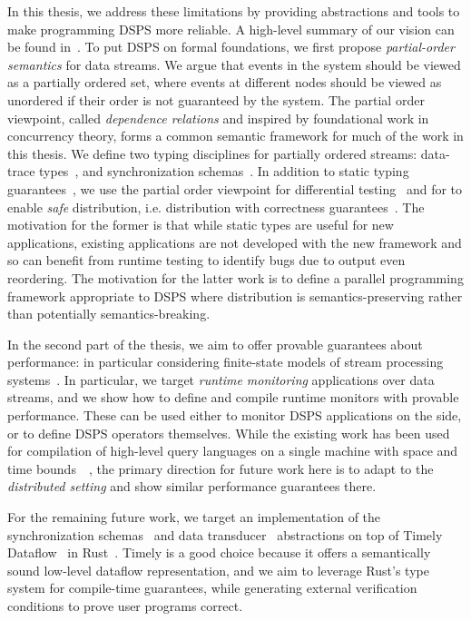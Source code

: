 In this thesis, we address these limitations by providing abstractions and tools to make programming DSPS more reliable.
A high-level summary of our vision can be found in~.
To put DSPS on formal foundations, we first propose \emph{partial-order semantics} for data streams.
We argue that events in the system should be viewed as a partially ordered set,
where events at different nodes should be viewed as unordered if their order
is not guaranteed by the system.
The partial order viewpoint, called \emph{dependence relations} and inspired by foundational work in concurrency theory,
forms a common semantic framework for much of the work in this thesis.
We define two typing disciplines for partially ordered streams:
data-trace types~,
and synchronization schemas~.
In addition to static typing guarantees~,
we use the partial order viewpoint for differential testing~
and for to enable \emph{safe} distribution, i.e. distribution with correctness guarantees~.
The motivation for the former is that while static types are useful
for new applications, existing applications are not developed with the new
framework and so can benefit from runtime testing to identify bugs due to
output even reordering.
The motivation for the latter work is to define a parallel programming framework appropriate to DSPS where distribution is semantics-preserving
rather than potentially semantics-breaking.

In the second part of the thesis, we aim to offer provable guarantees about performance: in particular considering finite-state models of stream processing systems~.
In particular, we target \emph{runtime monitoring} applications
over data streams, and we show how to define and compile runtime monitors
with provable performance.
These can be used either to monitor DSPS applications on the side,
or to define DSPS operators themselves.
While the existing work has been used for compilation of high-level query languages on a single machine with space and time bounds~~\cite{QRE,StreamQRE},
the primary direction for future work here is to adapt to the \emph{distributed setting} and show similar performance guarantees there.

For the remaining future work, we target an implementation of the synchronization schemas~ and data transducer~ abstractions on top of Timely Dataflow~\cite{Timely,Naiad2013} in Rust~\cite{RustLang}.
Timely is a good choice because it offers a semantically sound low-level dataflow representation,
and we aim to leverage Rust's type system for compile-time guarantees,
while generating external verification conditions to prove user programs correct.

